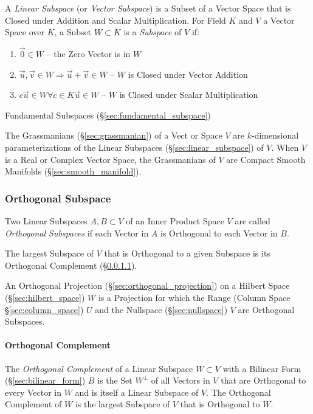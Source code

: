 A \emph{Linear Subspace} (or \emph{Vector Subspace}) is a Subset of a Vector
Space that is Closed under Addition and Scalar Multiplication. For Field $K$
and $V$ a Vector Space over $K$, a Subset $W \subset K$ is a \emph{Subspace} of
$V$ if:
\begin{enumerate}
  \item $\vec{0} \in W$ -- the Zero Vector is in $W$
  \item $\vec{u}, \vec{v} \in W \Rightarrow \vec{u} + \vec{v} \in W$
    -- $W$ is Closed under Vector Addition
  \item $c\vec{u} \in W \forall c \in K \vec{u} \in W$
    -- $W$ is Closed under Scalar Multiplication
\end{enumerate}

\fist Fundamental Subspaces (\S\ref{sec:fundamental_subspace})

The Grassmanians (\S\ref{sec:grassmanian}) of a Vect or Space $V$ are
$k$-dimensional parameterizations of the Linear Subspaces
(\S\ref{sec:linear_subspace}) of $V$. When $V$ is a Real or Complex Vector
Space, the Grassmanians of $V$ are Compact Smooth Manifolds
(\S\ref{sec:smooth_manifold}).



\subsubsection{Orthogonal Subspace}\label{sec:orthogonal_subspace}

Two Linear Subspaces $A, B \subset V$ of an Inner Product Space $V$ are called
\emph{Orthogonal Subspaces} if each Vector in $A$ is Orthogonal to each Vector
in $B$.

The largest Subspace of $V$ that is Orthogonal to a given Subspace is its
Orthogonal Complement (\S\ref{sec:orthogonal_complement}).

An Orthogonal Projection (\S\ref{sec:orthogonal_projection}) on a Hilbert Space
(\S\ref{sec:hilbert_space}) $W$ is a Projection for which the Range (Column
Space \S\ref{sec:column_space}) $U$ and the Nullspace (\S\ref{sec:nullspace})
$V$ are Orthogonal Subspaces.



\paragraph{Orthogonal Complement}\label{sec:orthogonal_complement}\hfill

The \emph{Orthogonal Complement} of a Linear Subspace $W \subset V$ with a
Bilinear Form (\S\ref{sec:bilinear_form}) $B$ is the Set $W^\bot$ of all
Vectors in $V$ that are Orthogonal to every Vector in $W$ and is itself a
Linear Subspace of $V$. The Orthogonal Complement of $W$ is the largest
Subspace of $V$ that is Orthogonal to $W$.



